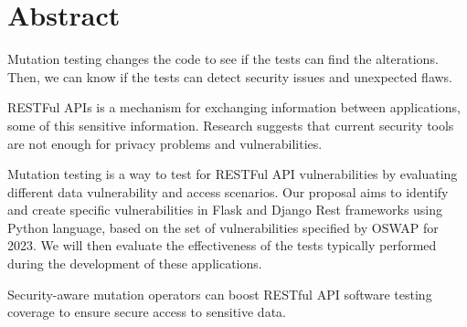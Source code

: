 \chapter*{Abstract}

Mutation testing changes the code to see if the tests can find the alterations. Then, we can know if the tests can detect security issues and unexpected flaws.


RESTFul APIs is a mechanism for exchanging information between applications, some of this sensitive information. Research suggests that current security tools are not enough for privacy problems and vulnerabilities.


Mutation testing is a way to test for RESTFul API vulnerabilities by evaluating different data vulnerability and access scenarios. Our proposal aims to identify and create specific vulnerabilities in Flask and Django Rest frameworks using Python language, based on the set of vulnerabilities specified by OSWAP for 2023. We will then evaluate the effectiveness of the tests typically performed during the development of these applications.


Security-aware mutation operators can boost RESTful API software testing coverage to ensure secure access to sensitive data.